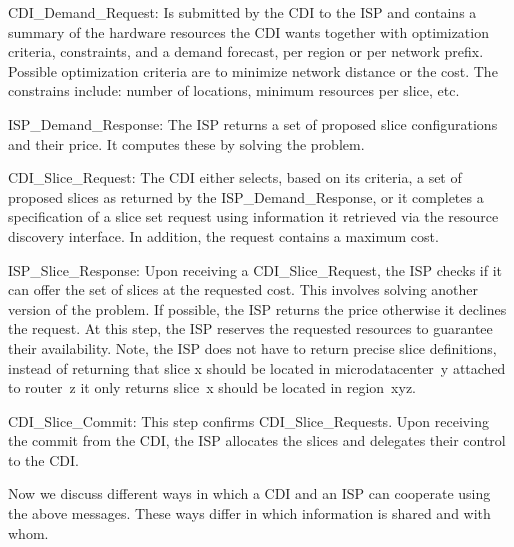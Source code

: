 \begin{description*}

\item [CDI\_Demand\_Request:] Is submitted by the CDI to the ISP and contains a
summary of the hardware resources the CDI wants together with optimization
criteria, constraints, and a demand forecast, \eg per region or per network
prefix.  Possible optimization criteria are to minimize network distance or the
cost. The constrains include: number of locations, minimum resources per slice,
etc.

\item [ISP\_Demand\_Response:] The ISP returns a set of proposed slice
configurations and their price. It computes these by solving the
\sliceallocation problem.

\item [CDI\_Slice\_Request:] The CDI either selects, based on its criteria, a
set of proposed slices as returned by the ISP\_De\-mand\_Response, or it
completes a specification of a slice set request using information it retrieved
via the resource discovery interface. In addition, the request contains a
maximum cost.

\item [ISP\_Slice\_Response:] Upon receiving a CDI\_Slice\_Request, the ISP
checks if it can offer the set of slices at the requested cost. This involves
solving another version of the \sliceallocation problem. If possible, the ISP
returns the price otherwise it declines the request.  At this step, the ISP
reserves the requested resources to guarantee their availability. Note, the ISP
does not have to return precise slice definitions, \eg instead of returning
that slice x should be located in microdatacenter~y attached to router~z it
only returns slice~x should be located in region~xyz.

\item [CDI\_Slice\_Commit:] This step confirms CDI\_Slice\_Requests. Upon
receiving the commit from the CDI, the ISP allocates the slices and delegates
their control to the CDI.  

\end{description*}

Now we discuss different ways in which a CDI and an ISP can cooperate using the
above messages. These ways differ in which information is shared and with whom.

